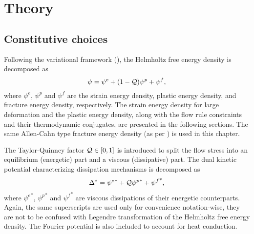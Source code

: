 \section{Theory}
\label{section: Chapter5/theory}

\subsection{Constitutive choices}
\label{section: Chapter5/theory/constitutive}

Following the variational framework (), the Helmholtz free energy density is decomposed as
\begin{align}
  \psi = \psi^e + (1-\mathcal{Q}) \psi^p + \psi^f, \label{eq: chapter 5 helmholtz}
\end{align}
where $\psi^e$, $\psi^p$ and $\psi^f$ are the strain energy density, plastic energy density, and fracture energy density, respectively. The strain energy density for large deformation and the plastic energy density, along with the flow rule constraints and their thermodynamic conjugates, are presented in the following sections. The same Allen-Cahn type fracture energy density (as per ) is used in this chapter.

The Taylor-Quinney factor $\mathcal{Q} \in [0, 1]$ is introduced to split the flow stress into an equilibrium (energetic) part and a viscous (dissipative) part. The dual kinetic potential characterizing dissipation mechanisms is decomposed as
\begin{align}
  \Delta^* = {\psi^e}^* + \mathcal{Q} {\psi^p}^* + {\psi^f}^*, \label{eq: chapter 5 dual kinetic potential}
\end{align}
where ${\psi^e}^*$, ${\psi^p}^*$ and ${\psi^f}^*$ are viscous dissipations of their energetic counterparts. Again, the same superscripts are used only for convenience notation-wise, they are not to be confused with Legendre transformation of the Helmholtz free energy density. The Fourier potential is also included to account for heat conduction.

